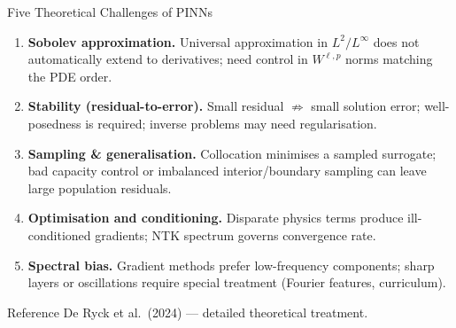 \documentclass[aspectratio=169,10pt]{beamer}
\begin{document}
\begin{frame}{Five Theoretical Challenges of PINNs}
  \begin{enumerate}\itemsep4pt
    \item \textbf{Sobolev approximation.}
          Universal approximation in $L^2/L^\infty$ does not automatically
          extend to derivatives; need control in $W^{\ell,p}$ norms matching
          the PDE order.

    \item \textbf{Stability (residual-to-error).}
          Small residual $\not\Rightarrow$ small solution error; well-posedness
          is required; inverse problems may need regularisation.

    \item \textbf{Sampling \& generalisation.}
          Collocation minimises a sampled surrogate; bad capacity control or
          imbalanced interior/boundary sampling can leave large population
          residuals.

    \item \textbf{Optimisation and conditioning.}
          Disparate physics terms produce ill-conditioned gradients; NTK
          spectrum governs convergence rate.

    \item \textbf{Spectral bias.}
          Gradient methods prefer low-frequency components; sharp layers or
          oscillations require special treatment (Fourier features, curriculum).
  \end{enumerate}

  \vspace{0.2cm}
  \begin{block}{Reference}
    De Ryck et al.\ (2024) — detailed theoretical treatment.
  \end{block}
\end{frame}
\end{document}
